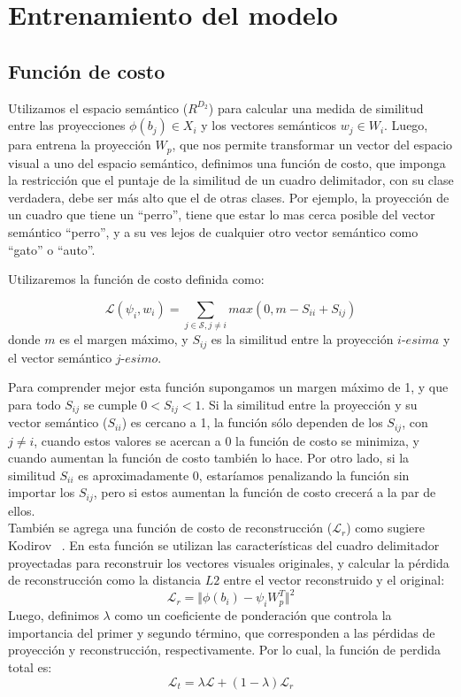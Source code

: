 \section{Entrenamiento del modelo}\label{ssec:entrenamiento}

\subsection{Función de costo}

Utilizamos el espacio semántico (${R}^{D_2}$) para calcular una medida de similitud entre las proyecciones $\phi(b_j) \in X_i	$ y los vectores semánticos $w_j \in W_i$. Luego, para entrena la proyección $W_p$, que nos permite transformar un vector del espacio visual a uno del espacio semántico, definimos una función de costo, que imponga la restricción que el puntaje de la similitud de un cuadro delimitador, con su clase verdadera, debe ser más alto que el de otras clases. Por ejemplo, la proyección de un cuadro que tiene un ``perro'', tiene que estar lo mas cerca posible del vector semántico ``perro'', y a su ves lejos de cualquier otro vector semántico como ``gato'' o ``auto''.

Utilizaremos la función de costo definida como: 

\[\mathcal{L}(\psi_i, w_i) = \sum_{j \in \mathcal{S}, j\neq i} max(0, m - S_{ii} + S_{ij})\] 
donde $m$ es el margen máximo, y $S_{ij}$ es la similitud entre la proyección $i$-$esima$ y el vector semántico $j$-$esimo$. 

Para comprender mejor esta función supongamos un margen máximo de 1, y que para todo $S_{ij}$ se cumple $0 < S_{ij} < 1$. Si la similitud entre la proyección y su vector semántico ($S_{ii}$) es cercano a 1, la función sólo dependen de los $S_{ij}$, con $j \neq i$, cuando estos valores se acercan a 0 la función de costo se minimiza, y cuando aumentan la función de costo también lo hace. Por otro lado, si la similitud $S_{ii}$ es aproximadamente 0, estaríamos penalizando la función sin importar los $S_{ij}$, pero si estos aumentan la función de costo crecerá a la par de ellos. \\


También se agrega una función de costo de reconstrucción ($\mathcal{L}_r$) como sugiere Kodirov \etal~\cite{kodirov2017semantic}. En esta función se utilizan las características del cuadro delimitador proyectadas para reconstruir los vectores visuales originales, y calcular la pérdida de reconstrucción como la distancia $L2$  entre el vector reconstruido y el original:
\[\mathcal{L}_r = \Vert{\phi(b_i) - \psi_iW_p^T}\Vert^2 \] 
Luego, definimos $\lambda$ como un coeficiente de ponderación que controla la importancia del primer y segundo término, que corresponden a las pérdidas de proyección y reconstrucción, respectivamente. Por lo cual, la función de perdida total es: 
\[\mathcal{L}_t = \lambda \mathcal{L} + (1-\lambda) \mathcal{L}_r \]
 
